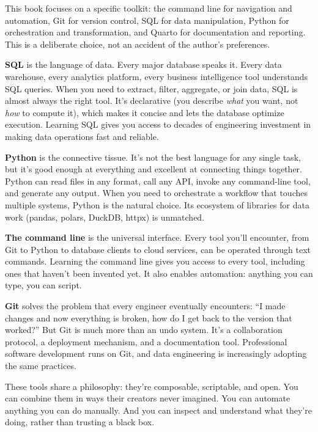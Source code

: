 \documentclass[
  letterpaper,
  DIV=11,
  numbers=noendperiod]{scrreprt}
\begin{document}

This book focuses on a specific toolkit: the command line for navigation
and automation, Git for version control, SQL for data manipulation,
Python for orchestration and transformation, and Quarto for
documentation and reporting. This is a deliberate choice, not an
accident of the author's preferences.

\textbf{SQL} is the language of data. Every major database speaks it.
Every data warehouse, every analytics platform, every business
intelligence tool understands SQL queries. When you need to extract,
filter, aggregate, or join data, SQL is almost always the right tool.
It's declarative (you describe \emph{what} you want, not \emph{how} to
compute it), which makes it concise and lets the database optimize
execution. Learning SQL gives you access to decades of engineering
investment in making data operations fast and reliable.

\textbf{Python} is the connective tissue. It's not the best language for
any single task, but it's good enough at everything and excellent at
connecting things together. Python can read files in any format, call
any API, invoke any command-line tool, and generate any output. When you
need to orchestrate a workflow that touches multiple systems, Python is
the natural choice. Its ecosystem of libraries for data work (pandas,
polars, DuckDB, httpx) is unmatched.

\textbf{The command line} is the universal interface. Every tool you'll
encounter, from Git to Python to database clients to cloud services, can
be operated through text commands. Learning the command line gives you
access to every tool, including ones that haven't been invented yet. It
also enables automation: anything you can type, you can script.

\textbf{Git} solves the problem that every engineer eventually
encounters: ``I made changes and now everything is broken, how do I get
back to the version that worked?'' But Git is much more than an undo
system. It's a collaboration protocol, a deployment mechanism, and a
documentation tool. Professional software development runs on Git, and
data engineering is increasingly adopting the same practices.

These tools share a philosophy: they're composable, scriptable, and
open. You can combine them in ways their creators never imagined. You
can automate anything you can do manually. And you can inspect and
understand what they're doing, rather than trusting a black box.
\end{document}
